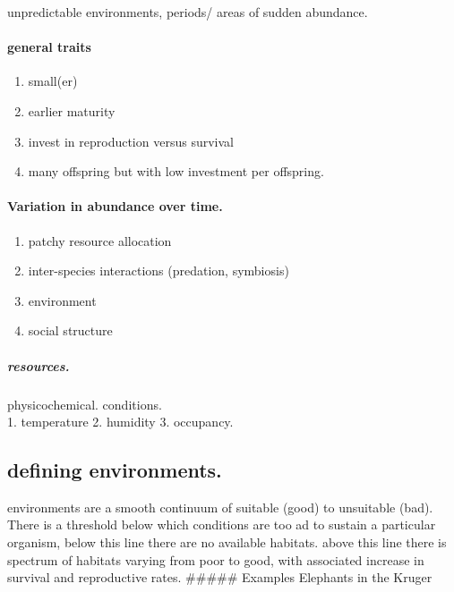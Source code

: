 \documentclass[]{article}
\providecommand{\tightlist}{%
  \setlength{\itemsep}{0pt}\setlength{\parskip}{0pt}}
\let\oldparagraph\paragraph
\renewcommand{\paragraph}[1]{\oldparagraph{#1}\mbox{}}
\let\oldsubparagraph\subparagraph
\renewcommand{\subparagraph}[1]{\oldsubparagraph{#1}\mbox{}}
\begin{document}
unpredictable environments, periods/ areas of sudden abundance.

\hypertarget{general-traits-1}{%
\paragraph{general traits}\label{general-traits-1}}

\begin{enumerate}
\def\labelenumi{\arabic{enumi}.}
\tightlist
\item
  small(er)
\item
  earlier maturity
\item
  invest in reproduction versus survival
\item
  many offspring but with low investment per offspring.
\end{enumerate}

\hypertarget{variation-in-abundance-over-time.}{%
\paragraph{Variation in abundance over
time.}\label{variation-in-abundance-over-time.}}

\begin{enumerate}
\def\labelenumi{\arabic{enumi}.}
\tightlist
\item
  patchy resource allocation
\item
  inter-species interactions (predation, symbiosis)
\item
  environment
\item
  social structure
\end{enumerate}

\hypertarget{resources.}{%
\subparagraph{resources.}\label{resources.}}

physicochemical. conditions.\\
1. temperature 2. humidity 3. occupancy.

\hypertarget{defining-environments.}{%
\subsection{defining environments.}\label{defining-environments.}}

environments are a smooth continuum of suitable (good) to unsuitable
(bad). There is a threshold below which conditions are too ad to sustain
a particular organism, below this line there are no available habitats.
above this line there is spectrum of habitats varying from poor to good,
with associated increase in survival and reproductive rates. \#\#\#\#\#
Examples Elephants in the Kruger
\end{document}
